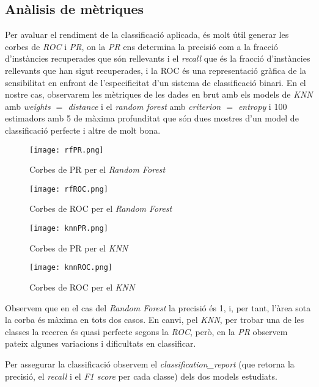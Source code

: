 \documentclass[a4paper, 11pt]{article}
\begin{document}
        \subsection{Anàlisis de mètriques}
        Per avaluar el rendiment de la classificació aplicada, és molt útil generar les corbes de \textit{ROC} i \textit{PR},
        on la \textit{PR} ens determina la precisió com a la fracció d'instàncies recuperades que són rellevants i el \textit{recall} que és la fracció d'instàncies rellevants que han sigut recuperades, i la ROC és una representació gràfica de la sensibilitat en enfront de l'especificitat d'un sistema de classificació binari.
        En el nostre cas, observarem les mètriques de les dades en brut amb els models de \textit{KNN} amb \textit{weights $=$ distance} i el \textit{random forest} amb \textit{criterion $=$ entropy} i 100 estimadors amb 5 de màxima profunditat que són dues mostres d'un model de classificació perfecte i altre de molt bona.

        \begin{figure}[H]
            \centering
            \texttt{[image: rfPR.png]}
            \caption{Corbes de PR per el \textit{Random Forest}}
        \end{figure}
        \begin{figure}[H]
            \centering
            \texttt{[image: rfROC.png]}
            \caption{Corbes de ROC per el \textit{Random Forest}}
            \end{figure}

        \begin{figure}[H]
            \centering
            \texttt{[image: knnPR.png]}
            \caption{Corbes de PR per el \textit{KNN}}
            \end{figure}
        \begin{figure}[H]
            \centering
            \texttt{[image: knnROC.png]}
            \caption{Corbes de ROC per el \textit{KNN}}
            \end{figure}
        Observem que en el cas del \textit{Random Forest} la precisió és 1, i, per tant, l'àrea sota la corba és màxima en tots dos casos.
        En canvi, pel \textit{KNN}, per trobar una de les classes la recerca és quasi perfecte segons la \textit{ROC}, però, en la \textit{PR} observem pateix algunes variacions i dificultats en classificar.

        Per assegurar la classificació observem el \textit{classification\_report} (que retorna la precisió, el \textit{recall} i el \textit{F1 score} per cada classe) dels dos models estudiats.
\end{document}
